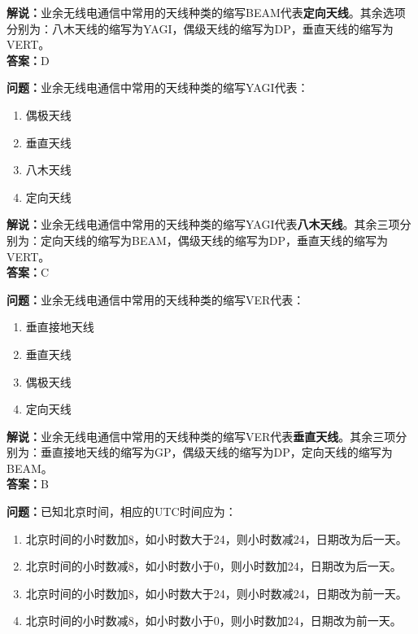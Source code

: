 \textbf{解说：}业余无线电通信中常用的天线种类的缩写BEAM代表\textbf{定向天线}。其余选项分别为：八木天线的缩写为YAGI，偶级天线的缩写为DP，垂直天线的缩写为VERT。\\\textbf{答案：}D



\textbf{问题：}业余无线电通信中常用的天线种类的缩写YAGI代表：

\begin{enumerate}[label=\Alph*), leftmargin=1.5cm]
	\item 偶极天线
	\item 垂直天线
	\item 八木天线
	\item 定向天线
\end{enumerate}

\textbf{解说：}业余无线电通信中常用的天线种类的缩写YAGI代表\textbf{八木天线}。其余三项分别为：定向天线的缩写为BEAM，偶级天线的缩写为DP，垂直天线的缩写为VERT。\\\textbf{答案：}C



\textbf{问题：}业余无线电通信中常用的天线种类的缩写VER代表：

\begin{enumerate}[label=\Alph*), leftmargin=1.5cm]
	\item 垂直接地天线
	\item 垂直天线
	\item 偶极天线
	\item 定向天线
\end{enumerate}

\textbf{解说：}业余无线电通信中常用的天线种类的缩写VER代表\textbf{垂直天线}。其余三项分别为：垂直接地天线的缩写为GP，偶级天线的缩写为DP，定向天线的缩写为BEAM。\\\textbf{答案：}B



\textbf{问题：}已知北京时间，相应的UTC时间应为：

\begin{enumerate}[label=\Alph*), leftmargin=1.5cm]
	\item 北京时间的小时数加8，如小时数大于24，则小时数减24，日期改为后一天。
	\item 北京时间的小时数减8，如小时数小于0，则小时数加24，日期改为后一天。
	\item 北京时间的小时数加8，如小时数大于24，则小时数减24，日期改为前一天。
	\item 北京时间的小时数减8，如小时数小于0，则小时数加24，日期改为前一天。
\end{enumerate}

